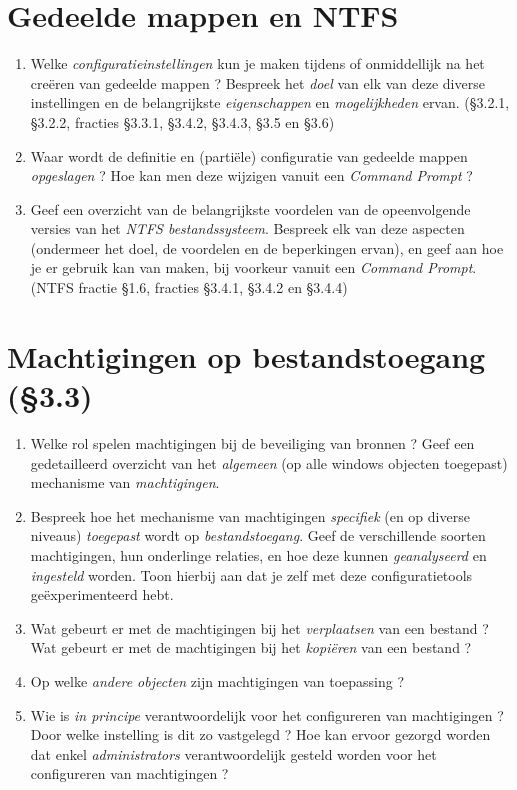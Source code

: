 \documentclass{report}
\begin{document}
	\section{Gedeelde mappen en NTFS}
	\begin{enumerate}
		\item Welke \textit{configuratieinstellingen} kun je maken tijdens of onmiddellijk na het creëren van gedeelde mappen ? Bespreek het \textit{doel} van elk van deze diverse instellingen en de belangrijkste \textit{eigenschappen} en \textit{mogelijkheden} ervan. {\color{red}(§3.2.1, §3.2.2, fracties §3.3.1, §3.4.2, §3.4.3, §3.5 en §3.6)}
		
		\item Waar wordt de definitie en (partiële) configuratie van gedeelde mappen \textit{opgeslagen} ? Hoe kan men deze wijzigen vanuit een \textit{Command Prompt} ? 
		
		\item Geef een overzicht van de belangrijkste voordelen van de opeenvolgende versies van het \textit{NTFS bestandssysteem}. Bespreek elk van deze aspecten (ondermeer het doel, de voordelen en de beperkingen ervan), en geef aan hoe je er gebruik kan van maken, bij voorkeur vanuit een \textit{Command Prompt}. {\color{red}(NTFS fractie §1.6, fracties §3.4.1, §3.4.2 en §3.4.4)}
	\end{enumerate}

	\section{Machtigingen op bestandstoegang {\color{red}(§3.3)}}
	\begin{enumerate}
		\item Welke rol spelen machtigingen bij de beveiliging van bronnen ? Geef een gedetailleerd overzicht van het \textit{algemeen} (op alle windows objecten toegepast) mechanisme van \textit{machtigingen}.
		
		\item Bespreek hoe het mechanisme van machtigingen \textit{specifiek} (en op diverse niveaus) \textit{toegepast} wordt op \textit{bestandstoegang}. Geef de verschillende soorten machtigingen, hun onderlinge relaties, en hoe deze kunnen \textit{geanalyseerd} en \textit{ingesteld} worden. Toon hierbij aan dat je zelf met deze configuratietools geëxperimenteerd hebt.
		
		\item Wat gebeurt er met de machtigingen bij het \textit{verplaatsen} van een bestand ? Wat gebeurt er met de machtigingen bij het \textit{kopiëren} van een bestand ?
		
		\item Op welke \textit{andere objecten} zijn machtigingen van toepassing ?
		
		\item Wie is \textit{in principe} verantwoordelijk voor het configureren van machtigingen ? Door welke instelling is dit zo vastgelegd ? Hoe kan ervoor gezorgd worden dat enkel \textit{administrators} verantwoordelijk gesteld worden voor het configureren van machtigingen ?
		
	\end{enumerate}
\end{document}
